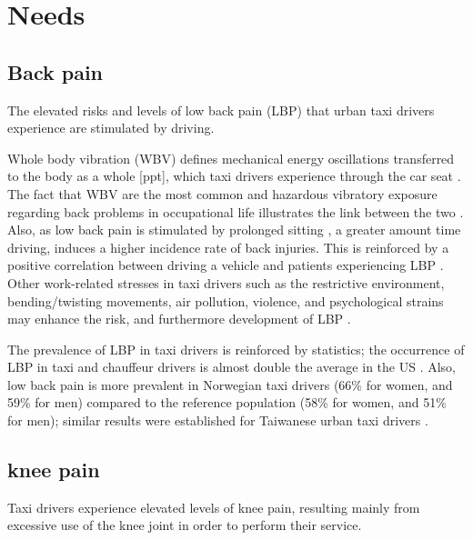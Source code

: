 \documentclass[11pt]{article}
\begin{document}
\section{Needs}
\label{sec:needs}
\subsection{Back pain}
The elevated risks and levels of low back pain (LBP) that urban taxi drivers 
experience are stimulated by driving. 

Whole body vibration (WBV) defines mechanical energy oscillations transferred to 
the body as a whole [ppt], which taxi drivers experience \cite{KneePain, Serious} 
through the car seat \cite{ppt}. The fact that WBV are the most common and hazardous 
vibratory exposure regarding back problems in occupational life illustrates the
link between the two \cite{ODrivers@Risk}. Also, as low back pain is stimulated by 
prolonged sitting \cite{Okunribido2008}, a greater amount time driving, induces a 
higher incidence rate of back injuries\cite{Question?}. This is reinforced by a positive 
correlation between driving a vehicle and patients experiencing LBP \cite{ODrivers@Risk}. 
Other work-related stresses in taxi drivers such as the restrictive environment, bending/twisting 
movements, air pollution, violence, and psychological strains may enhance the risk, 
and furthermore development of LBP \cite{KneePain, POSTULATED}. 

The prevalence of LBP in taxi drivers is reinforced by statistics; the occurrence of LBP 
in taxi and chauffeur drivers is almost double the average in the US \cite{68}. Also, low 
back pain is more prevalent in Norwegian taxi drivers (66\% for women, and 59\% for men) 
compared to the reference population (58\% for women, and 51\% for men); similar results 
were established for Taiwanese urban taxi drivers \cite{Question?}.

 
\subsection{knee pain}
Taxi drivers experience elevated levels of knee pain, resulting mainly from excessive use 
of the knee joint in order to perform their service. 
\end{document}
